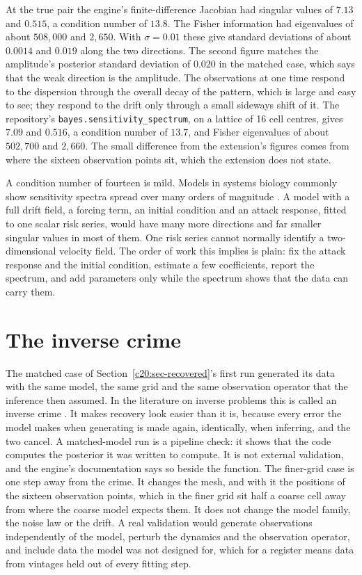 At the true pair the engine's finite-difference Jacobian had singular values of $7.13$ and
$0.515$, a condition number of $13.8$. The Fisher information had eigenvalues of about $508{,}000$
and $2{,}650$. With $\sigma=0.01$ these give standard deviations of about $0.0014$ and $0.019$ along
the two directions. The second figure matches the amplitude's posterior standard deviation
of $0.020$ in the matched case, which says that the weak direction is the amplitude. The
observations at one time respond to the dispersion through the overall decay of the pattern,
which is large and easy to see; they respond to the drift only through a small sideways shift
of it. The repository's \texttt{bayes.sensitivity\_spectrum}, on a lattice of 16 cell centres, gives $7.09$ and $0.516$, a condition number of $13.7$, and Fisher eigenvalues of about $502{,}700$ and $2{,}660$.
The small difference from the extension's figures comes from where the sixteen observation points sit, which the extension does not state.

A condition number of fourteen is mild. Models in systems biology commonly show
sensitivity spectra spread over many orders of magnitude \citep{gutenkunst2007}. A model
with a full drift field, a forcing term, an initial condition and an attack response, fitted to one
scalar risk series, would have many more directions and far smaller singular values in most
of them. One risk series cannot normally identify a two-dimensional velocity field. The
order of work this implies is plain: fix the attack response and the initial condition, estimate
a few coefficients, report the spectrum, and add parameters only while the spectrum shows
that the data can carry them.

\section{The inverse crime}

The matched case of Section~\ref{c20:sec-recovered}'s first run generated its data with the same model, the same grid
and the same observation operator that the inference then assumed. In the literature on inverse
problems this is called an inverse crime \citep{kaipio2007}. It makes recovery
look easier than it is, because every error the model makes when generating is made again,
identically, when inferring, and the two cancel. A matched-model run is a pipeline check:
it shows that the code computes the posterior it was written to compute. It is not external
validation, and the engine's documentation says so beside the function. The finer-grid case
is one step away from the crime. It changes the mesh, and with it the positions of the sixteen
observation points, which in the finer grid sit half a coarse cell away from where the coarse
model expects them. It does not change the model family, the noise law or the drift. A real
validation would generate observations independently of the model, perturb the dynamics
and the observation operator, and include data the model was not designed for, which for a
register means data from vintages held out of every fitting step.

